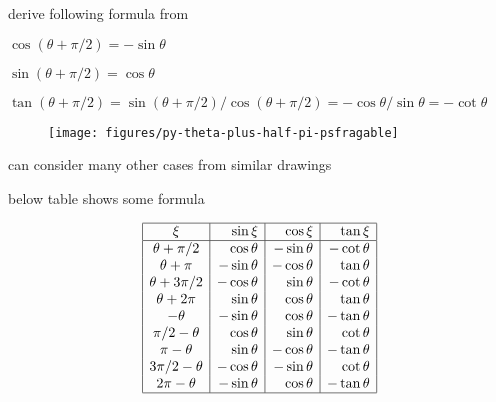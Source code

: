 \documentclass[17pt,landscape]{foils}
\begin{document}
{{

\bit
\item
	derive following formula from 
	\bit
	\item
		$\cos(\theta+\pi/2) = -\sin\theta$
	\item
		$\sin(\theta+\pi/2) = \cos\theta$
	\item
		$\tan(\theta+\pi/2) = \sin(\theta+\pi/2)/\cos(\theta+\pi/2) = -\cos\theta/\sin\theta= -\cot \theta$
	\eit
\eit

\begin{figure}
\begin{center}
	\texttt{[image: figures/py-theta-plus-half-pi-psfragable]}
		\label{fig:tri conversion rules for theta plus pi over 2}
\end{center}
\end{figure}


\iffalse
{}

\bit
\item
	can consider many other cases from similar drawings

\vitem
	below table shows some formula

	\[
	\begin{array}{|c|r|r|r|}
		\hline
		\xi & \sin\xi & \cos\xi & \tan\xi
		\\
		\hline
		\theta +\pi/2& \cos\theta & -\sin\theta & -\cot\theta
		\\
		\theta + \pi & -\sin\theta & -\cos\theta & \tan\theta
		\\
		\theta + 3\pi/2 & -\cos\theta & \sin\theta & -\cot\theta
		\\
		\theta + 2\pi & \sin\theta & \cos\theta & \tan\theta
		\\
		-\theta & -\sin\theta & \cos\theta & -\tan\theta
		\\
		\pi/2-\theta & \cos\theta & \sin\theta & \cot\theta
		\\
		\pi-\theta & \sin\theta & -\cos\theta & -\tan\theta
		\\
		3\pi/2-\theta & -\cos\theta & -\sin\theta & \cot\theta
		\\
		2\pi-\theta & -\sin\theta & \cos\theta & -\tan\theta
		\\
		\hline
	\end{array}
	\]

}}
\end{document}
